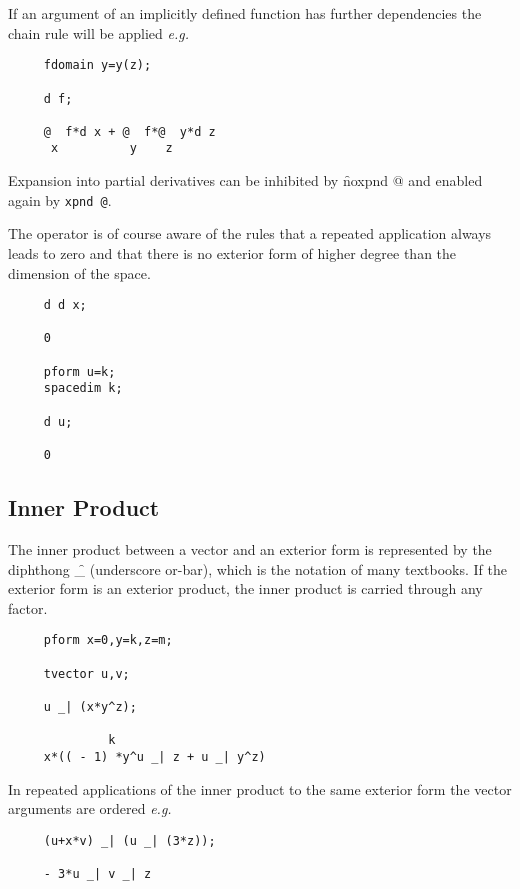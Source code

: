 If an argument of an implicitly defined function has further
dependencies the chain rule will be applied \emph{e.g.} 


\begin{verbatim}
     fdomain y=y(z);

     d f;

     @  f*d x + @  f*@  y*d z
      x          y    z
\end{verbatim}

Expansion into partial derivatives can be inhibited by
\f{noxpnd @}\label{NOXPNDA}
and enabled again by \texttt{xpnd @}\label{XPNDA}.
 

The operator is of course aware of the rules that a repeated
application always leads to zero and that there is no exterior form of
higher degree than the dimension of the space.

\begin{verbatim}
     d d x;

     0

     pform u=k;
     spacedim k;

     d u;

     0
\end{verbatim}
\subsection{Inner Product}
The inner product between a vector and an exterior form is represented
by the diphthong \f{\_\textbar} \label{innerp} (underscore or-bar), which is the
notation of many textbooks.  If the exterior form is an exterior
product, the inner product is carried through any factor.
\hypertarget{reserved:innerprodop}{}

\example{}

\begin{verbatim}
     pform x=0,y=k,z=m;

     tvector u,v;

     u _| (x*y^z);

              k
     x*(( - 1) *y^u _| z + u _| y^z)
\end{verbatim}

In repeated applications of the inner product to the same exterior
form the vector arguments are ordered \emph{e.g.}

\begin{verbatim}
     (u+x*v) _| (u _| (3*z));

     - 3*u _| v _| z
\end{verbatim}

